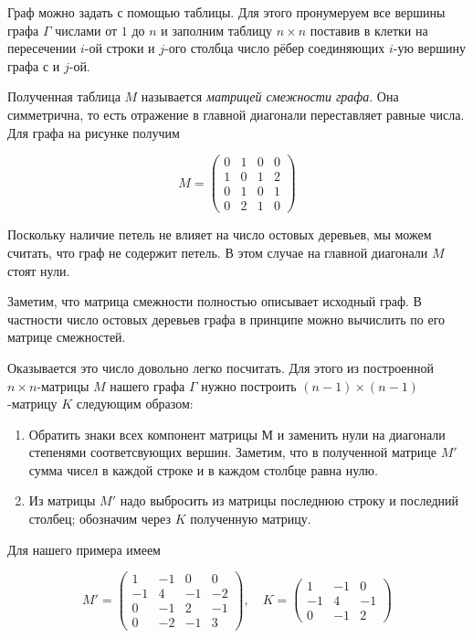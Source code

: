 \documentclass{article}
\begin{document}
Граф можно задать с помощью таблицы.
Для этого пронумеруем все вершины графа $\Gamma$ числами от $1$ до $n$ и заполним таблицу $n\times n$ поставив в клетки на пересечении $i$-ой строки и $j$-ого столбца число рёбер соединяющих $i$-ую вершину графа с и $j$-ой.

Полученная таблица $M$ называется \emph{матрицей смежности графа}.
Она симметрична, то есть отражение в главной диагонали переставляет равные числа.
Для графа на рисунке получим 

\[M=\left(
\begin{matrix}
0&1&0&0
\\
1&0&1&2
\\
0&1&0&1
\\
0&2&1&0
\end{matrix}
\right)\]

Поскольку наличие петель не влияет на число остовых деревьев, мы можем считать, что граф не содержит петель.
В этом случае на главной диагонали $M$ стоят нули.

Заметим, что матрица смежности полностью описывает исходный граф. 
В частности число остовых деревьев графа в принципе можно вычислить по его матрице смежностей.

Оказывается это число довольно легко посчитать.
Для этого из построенной $n\times n$-матрицы  $M$ нашего графа $\Gamma$ нужно построить $(n-1)\times(n-1)$-матрицу $K$ следующим образом: 

\begin{enumerate}
\item Обратить знаки всех компонент матрицы $М$ и заменить нули на диагонали степенями соответсвующих вершин. Заметим, что в полученной матрице $M'$ сумма чисел в каждой строке и в каждом столбце равна нулю. 
\item Из матрицы $M'$ надо выбросить из матрицы последнюю строку и последний столбец;
обозначим через $K$ полученную матрицу.
\end{enumerate}

Для нашего примера имеем

\[M'=\left(
\begin{matrix}
1&-1&0&0
\\
-1&4&-1&-2
\\
0&-1&2&-1
\\
0&-2&-1&3
\end{matrix}\right),
\quad 
K=\left(
\begin{matrix}
1&-1&0
\\
-1&4&-1
\\
0&-1&2
\end{matrix}
\right)\]
\end{document}
